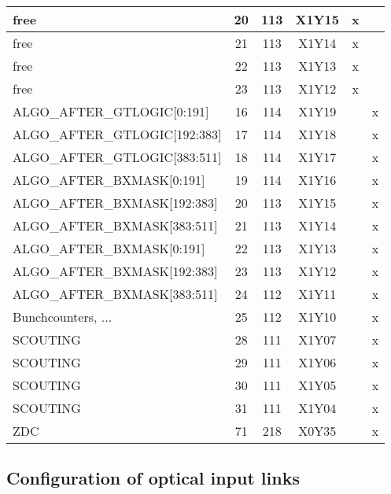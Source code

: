\begin{longtable}{|l|c|c|c|c|c|}
free & 20  & 113 & X1Y15 & x &   \\\hline
free & 21  & 113 & X1Y14 & x &   \\\hline
free & 22  & 113 & X1Y13 & x &   \\\hline
free & 23  & 113 & X1Y12 & x &   \\\hline\hline
ALGO\_AFTER\_GTLOGIC[0:191] & 16  & 114 & X1Y19 &   & x \\\hline
ALGO\_AFTER\_GTLOGIC[192:383] & 17  & 114 & X1Y18 &   & x \\\hline
ALGO\_AFTER\_GTLOGIC[383:511] & 18  & 114 & X1Y17 &   & x \\\hline
ALGO\_AFTER\_BXMASK[0:191] & 19  & 114 & X1Y16 &   & x \\\hline
ALGO\_AFTER\_BXMASK[192:383] & 20  & 113 & X1Y15 &   & x \\\hline
ALGO\_AFTER\_BXMASK[383:511] & 21  & 113 & X1Y14 &   & x \\\hline
ALGO\_AFTER\_BXMASK[0:191] & 22  & 113 & X1Y13 &   & x \\\hline
ALGO\_AFTER\_BXMASK[192:383] & 23  & 113 & X1Y12 &   & x \\\hline
ALGO\_AFTER\_BXMASK[383:511] & 24  & 112 & X1Y11 &   & x \\\hline
Bunchcounters, ... & 25  & 112 & X1Y10 &   & x \\\hline
SCOUTING & 28  & 111 & X1Y07 &   & x \\\hline
SCOUTING & 29  & 111 & X1Y06 &   & x \\\hline
SCOUTING & 30  & 111 & X1Y05 &   & x \\\hline
SCOUTING & 31  & 111 & X1Y04 &   & x \\\hline
ZDC & 71  & 218 & X0Y35 &   & x \\\hline
\end{longtable}

\clearpage

\subsection{Configuration of optical input links}\label{sec:app:app_b}

% 
% 

